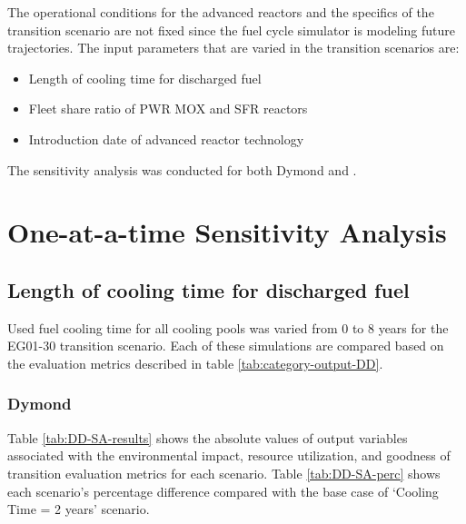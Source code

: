 The operational conditions for the advanced reactors and
the specifics of the transition scenario are not 
fixed since the fuel cycle simulator is modeling future 
trajectories. 
The input parameters that are varied in the
transition scenarios are: 
\begin{itemize}
    \item Length of cooling time for discharged fuel 
    \item Fleet share ratio of PWR MOX and SFR reactors 
	\item Introduction date of advanced reactor technology
\end{itemize}

The sensitivity analysis was conducted for both Dymond and \Cyclus. 

\section{One-at-a-time Sensitivity Analysis}

\subsection{Length of cooling time for discharged fuel}
Used fuel cooling time for all cooling pools was varied from 
0 to 8 years for the EG01-30 transition scenario. 
Each of these simulations are compared based on the evaluation 
metrics described in table \ref{tab:category-output-DD}.

\subsubsection{\textbf{Dymond}}
Table \ref{tab:DD-SA-results} shows the absolute values of 
output variables associated with the environmental impact, 
resource utilization, and goodness of transition evaluation 
metrics for each scenario. 
Table \ref{tab:DD-SA-perc} shows each scenario's percentage 
difference compared with the base case of `Cooling Time = 2 years'
scenario.

